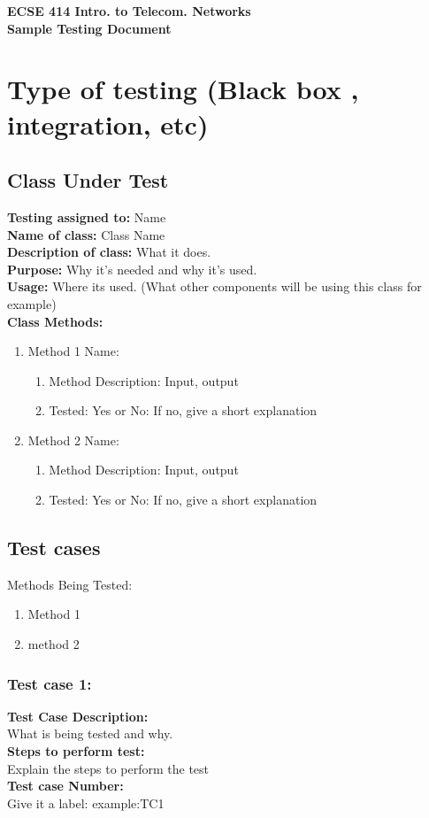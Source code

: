 \documentclass{article}
\begin{document}
\noindent
\large \textbf{ECSE 414 Intro. to Telecom. Networks}  \\
\large \textbf{Sample Testing Document} 
\tableofcontents

\section{Type of testing (Black box , integration, etc)}

\subsection{Class Under Test}
\textbf{Testing assigned to:} Name \\
\textbf{Name of class:} Class Name\\
\textbf{Description of class:} What it does.\\
\textbf{Purpose:} Why it's needed and why it's used.\\
\textbf{Usage:} Where its used. (What other components will be using this class for example)\\
\textbf{Class Methods:} 
\begin{enumerate}
    \item Method 1 Name:
    \begin{enumerate}
        \item Method Description: Input, output
        \item Tested: Yes or No: If no, give a short explanation
    \end{enumerate}
    \item Method 2 Name:
    \begin{enumerate}
        \item Method Description: Input, output
        \item Tested: Yes or No: If no, give a short explanation
    \end{enumerate}
\end{enumerate}
\subsection{Test cases}
Methods Being Tested:
\begin{enumerate}
    \item Method 1
    \item method 2 
\end{enumerate}

\subsubsection{Test case 1: }
\textbf{Test Case Description:\\} What is being tested and why.\\
\textbf{Steps to perform test: \\} Explain the steps to perform the test\\
\textbf{Test case Number: \\} Give it a label: example:TC1
\end{document}
